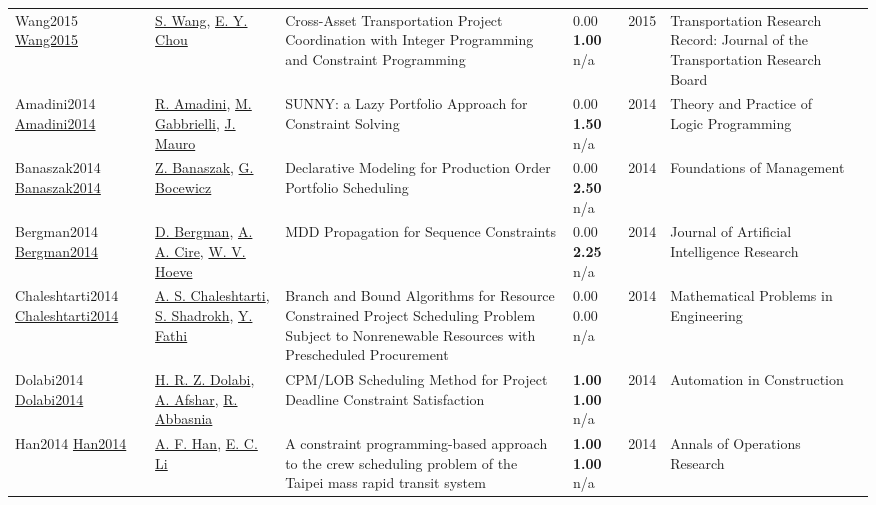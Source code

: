 {\begin{longtable}{p{3cm}p{5cm}p{10cm}p{1cm}rp{2.5cm}l}
Wang2015 \href{http://dx.doi.org/10.3141/2482-15}{Wang2015} & \hyperref[auth:a1710]{S. Wang}, \hyperref[auth:a1711]{E. Y. Chou} & Cross-Asset Transportation Project Coordination with Integer Programming and Constraint Programming & \noindent{}\textcolor{black!50}{0.00} \textbf{1.00} n/a & 2015 & Transportation Research Record: Journal of the Transportation Research Board & \cite{Wang2015}\\
Amadini2014 \href{http://dx.doi.org/10.1017/s1471068414000179}{Amadini2014} & \hyperref[auth:a910]{R. Amadini}, \hyperref[auth:a192]{M. Gabbrielli}, \hyperref[auth:a193]{J. Mauro} & \cellcolor{green!10}SUNNY: a Lazy Portfolio Approach for Constraint Solving & \noindent{}\textcolor{black!50}{0.00} \textbf{1.50} n/a & 2014 & Theory and Practice of Logic Programming & \cite{Amadini2014}\\
Banaszak2014 \href{http://dx.doi.org/10.1515/fman-2015-0014}{Banaszak2014} & \hyperref[auth:a1814]{Z. Banaszak}, \hyperref[auth:a630]{G. Bocewicz} & Declarative Modeling for Production Order Portfolio Scheduling & \noindent{}\textcolor{black!50}{0.00} \textbf{2.50} n/a & 2014 & Foundations of Management & \cite{Banaszak2014}\\
Bergman2014 \href{http://dx.doi.org/10.1613/jair.4199}{Bergman2014} & \hyperref[auth:a1514]{D. Bergman}, \hyperref[auth:a1515]{A. A. Cire}, \hyperref[auth:a1516]{W. V. Hoeve} & \cellcolor{gold!20}MDD Propagation for Sequence Constraints & \noindent{}\textcolor{black!50}{0.00} \textbf{2.25} n/a & 2014 & Journal of Artificial Intelligence Research & \cite{Bergman2014}\\
Chaleshtarti2014 \href{http://dx.doi.org/10.1155/2014/634649}{Chaleshtarti2014} & \hyperref[auth:a1755]{A. S. Chaleshtarti}, \hyperref[auth:a1756]{S. Shadrokh}, \hyperref[auth:a1757]{Y. Fathi} & \cellcolor{gold!20}Branch and Bound Algorithms for Resource Constrained Project Scheduling Problem Subject to Nonrenewable Resources with Prescheduled Procurement & \noindent{}\textcolor{black!50}{0.00} \textcolor{black!50}{0.00} n/a & 2014 & Mathematical Problems in Engineering & \cite{Chaleshtarti2014}\\
Dolabi2014 \href{http://dx.doi.org/10.1016/j.autcon.2014.09.003}{Dolabi2014} & \hyperref[auth:a1748]{H. R. Z. Dolabi}, \hyperref[auth:a1749]{A. Afshar}, \hyperref[auth:a1750]{R. Abbasnia} & CPM/LOB Scheduling Method for Project Deadline Constraint Satisfaction & \noindent{}\textbf{1.00} \textbf{1.00} n/a & 2014 & Automation in Construction & \cite{Dolabi2014}\\
Han2014 \href{http://dx.doi.org/10.1007/s10479-014-1619-1}{Han2014} & \hyperref[auth:a1664]{A. F. Han}, \hyperref[auth:a1665]{E. C. Li} & A constraint programming-based approach to the crew scheduling problem of the Taipei mass rapid transit system & \noindent{}\textbf{1.00} \textbf{1.00} n/a & 2014 & Annals of Operations Research & \cite{Han2014}\\

\end{longtable}}
